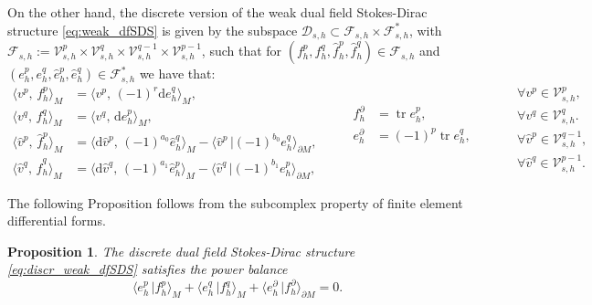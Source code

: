\documentclass{elsarticle}
\newtheorem{proposition}{Proposition}
\renewcommand\d{\ensuremath{\mathrm{d}}}
\DeclareMathOperator{\tr}{tr}
\newcommand*{\dual}[1]{\ensuremath{\widehat{#1}}}
\newcommand{\inpr}[3][]{\ensuremath{\langle #2, \, #3 \rangle_{#1}}}
\newcommand{\dualpr}[3][]{\ensuremath{\langle #2 \, \vert #3 \rangle_{#1}}}
\begin{document}
On the other hand, the discrete version of the weak dual field Stokes-Dirac structure \eqref{eq:weak_dfSDS} is given by the subspace $\mathcal{D}_{s, h} \subset \mathcal{F}_{s, h}\times \mathcal{F}^*_{s, h}$, with $\mathcal{F}_{s, h}:=\mathcal{V}_{s, h}^p\times\mathcal{V}_{s, h}^q\times\mathcal{V}_{s, h}^{q-1}\times \mathcal{V}_{s, h}^{p-1}$, such that for $(f^p_{h},f^q_{h},\dual{f}^p_{h},\dual{f}^q_{h})\in \mathcal{F}_{s, h}$ and $(e^p_{h},e^q_{h},\dual{e}^p_{h},\dual{e}^q_{h})\in \mathcal{F}_{s, h}^*$ we have that:\\
\begin{equation}\label{eq:discr_weak_dfSDS}
     \begin{aligned}
      \inpr[M]{v^p}{f^p_{h}} &= \inpr[M]{v^p}{(-1)^r\d e^q_{h}}, \\
      \inpr[M]{v^q}{f^q_{h}} &= \inpr[M]{v^q}{\d e^p_{h}}, \\
       \inpr[M]{\dual{v}^p}{\dual{f}^p_h} &= \inpr[M]{\d\dual{v}^p}{(-1)^{a_0} \dual{e}^q_h} - \dualpr[\partial M]{\dual{v}^p}{(-1)^{b_0} e^q_h}, \\
      \inpr[M]{\dual{v}^q}{\dual{f}^q_h} &= \inpr[M]{\d\dual{v}^q}{(-1)^{a_1} \dual{e}^p_h} - \dualpr[\partial M]{\dual{v}^q}{(-1)^{b_1} e^p_h},
     \end{aligned} \qquad
    \begin{aligned}
    f^\partial_{h} &= \tr e^p_{h}, \\
    e^\partial_{h} &=(-1)^p\tr e^q_{h}, \\
    \\
    \\
    \end{aligned} \qquad 
     \begin{aligned}
        &\forall v^p \in \mathcal{V}_{s, h}^p, \\
        &\forall v^q \in \mathcal{V}_{s, h}^q. \\
        &\forall \dual{v}^p \in \mathcal{V}_{s, h}^{q-1}, \\
        &\forall \dual{v}^q \in \mathcal{V}_{s, h}^{p-1}. \\
     \end{aligned}
\end{equation}

The following Proposition follows from the subcomplex property of finite element differential forms.
\begin{proposition}\label{pr:discr_powbal}
The discrete dual field Stokes-Dirac structure \eqref{eq:discr_weak_dfSDS} satisfies the power balance
\begin{equation}\label{eq:discr_powbal}
    \dualpr[M]{e^p_h}{f^p_h} + \dualpr[M]{e^q_h}{f^q_h} + \dualpr[\partial M]{e^\partial_h}{f^\partial_h} = 0.
\end{equation}
\end{proposition}
\end{document}
